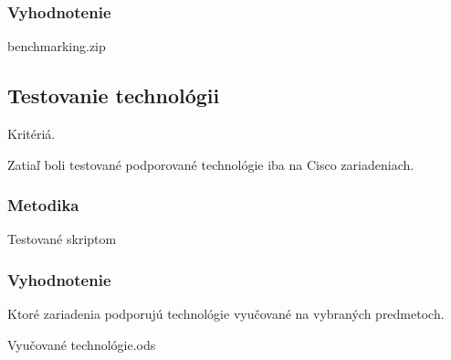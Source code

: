 \subsubsection{Vyhodnotenie}

benchmarking.zip

\subsection{Testovanie technológii}
\label{chap:testovanie_technologii}

Kritériá.

Zatiaľ boli testované podporované technológie iba na Cisco zariadeniach.

\subsubsection{Metodika}

Testované skriptom

\subsubsection{Vyhodnotenie}

Ktoré zariadenia podporujú technológie vyučované na vybraných predmetoch.

Vyučované technológie.ods